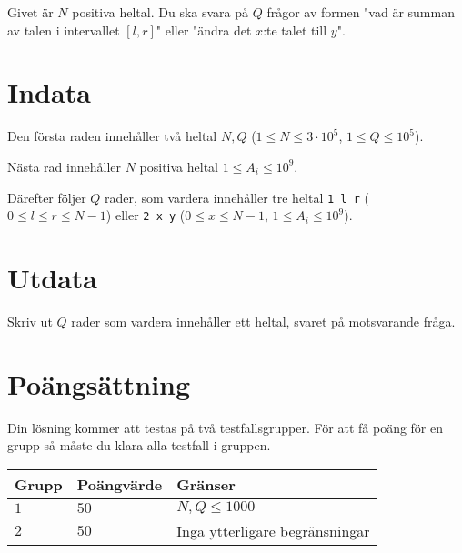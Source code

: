 Givet är $N$ positiva heltal. Du ska svara på $Q$ frågor av formen "vad är summan av talen i intervallet $[l,r]$" eller "ändra det $x$:te talet till $y$".

\section*{Indata}
Den första raden innehåller två heltal $N, Q$ ($1 \leq N \leq 3 \cdot 10^5$, $1 \leq Q \leq 10^5$).

Nästa rad innehåller $N$ positiva heltal $1 \leq A_i \leq 10^9$.

Därefter följer $Q$ rader, som vardera innehåller tre heltal \texttt{1 l r} ($0 \leq l \leq r \leq N-1$) eller \texttt{2 x y} ($0 \leq x \leq N-1$, $1 \leq A_i \leq 10^9$).

\section*{Utdata}
Skriv ut $Q$ rader som vardera innehåller ett heltal, svaret på motsvarande fråga.

\section*{Poängsättning}
Din lösning kommer att testas på två testfallsgrupper.
\noindent
För att få poäng för en grupp så måste du klara alla testfall i gruppen.

\noindent
\begin{tabular}{| l | l | l |}
\hline
  Grupp & Poängvärde & Gränser \\ \hline
  $1$    & $50$       &  $N,Q \leq 1000$ \\ \hline
  $2$    & $50$       &  Inga ytterligare begränsningar \\ \hline
\end{tabular}
